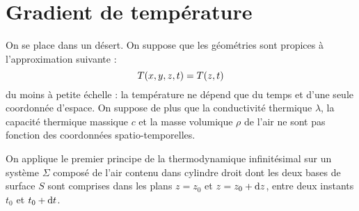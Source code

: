 \documentclass[a4paper,french,bookmarks]{article}
\begin{document}
    \renewcommand{\thesection}{\Roman{section}}
    \renewcommand{\labelenumi}{\thesection.\arabic{enumi}.}
    \renewcommand*{\labelenumii}{\thesection.\arabic{enumi}.\arabic{enumii}.}
    

    \bigskip

    \section{Gradient de température}

    \begin{minipage}{0.5\linewidth}
        On se place dans un désert. On suppose que les géométries sont propices à l'approximation suivante :
        \[ T\!\left(x, y, z, t\right) = T\!\left(z, t\right)\]
        du moins à petite échelle : la température ne dépend que du temps et d'une seule coordonnée d'espace. On suppose de plus que la conductivité thermique $\lambda$, la capacité thermique massique $c$ et la masse volumique $\rho$ de l'air ne sont pas fonction des coordonnées spatio-temporelles.
    \end{minipage}
    \hfill
    \begin{minipage}{0.4\linewidth}
    \end{minipage}

    \bigskip

    
    On applique le premier principe de la thermodynamique infinitésimal sur un système $\Sigma$ composé de l'air contenu dans cylindre droit dont les deux bases de surface $S$ sont comprises dans les plans $z = z_0$ et $z = z_0 + \mathrm d z$, entre deux instants $t_0$ et $t_0 + \mathrm d t$.\medskip
\end{document}
